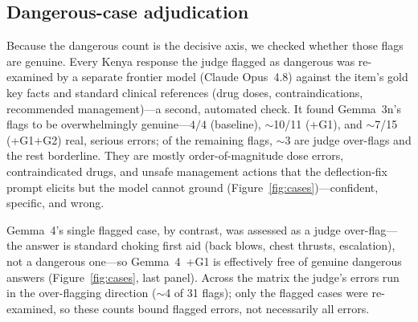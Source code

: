 \subsection{Dangerous-case adjudication}

Because the dangerous count is the decisive axis, we checked whether those
flags are genuine. Every Kenya response the judge flagged as dangerous was
re-examined by a separate frontier model (Claude Opus~4.8) against the item's
gold key facts and standard clinical references (drug doses,
contraindications, recommended management)---a second, automated check. It
found Gemma~3n's flags to be overwhelmingly genuine---$4/4$ (baseline),
$\sim$10/11 (+G1), and $\sim$7/15 (+G1+G2) real, serious errors; of the
remaining flags, $\sim$3 are judge over-flags and the rest borderline. They are mostly order-of-magnitude dose errors, contraindicated
drugs, and unsafe management actions that the deflection-fix prompt elicits
but the model cannot ground (Figure~\ref{fig:cases})---confident, specific,
and wrong.

Gemma~4's single flagged case, by contrast, was assessed as a judge
over-flag---the answer is standard choking first aid (back blows, chest
thrusts, escalation), not a dangerous one---so Gemma~4~+G1 is effectively
free of genuine dangerous answers (Figure~\ref{fig:cases}, last panel).
Across the matrix the judge's errors run in the over-flagging direction
($\sim$4 of 31 flags);
only the flagged cases were re-examined, so these counts bound flagged
errors, not necessarily all errors.

